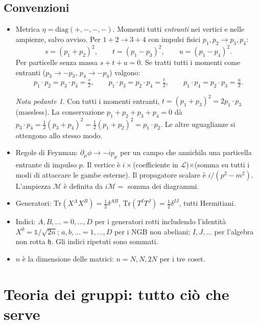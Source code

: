 \documentclass[11pt,a4paper]{article}
\numberwithin{equation}{section}
\theoremstyle{remark}
\newtheorem*{pedante}{Nota pedante}
\newcommand{\Tr}{\mathrm{Tr}}
\newcommand{\h}{\mathfrak{h}}
\newcommand{\one}{\mathbb{1}}
\begin{document}
\subsection{Convenzioni}

\begin{itemize}
\item Metrica $\eta=\mathrm{diag}(+,-,-,-)$. Momenti tutti \emph{entranti} nei vertici e nelle ampiezze, salvo avviso. Per $1+2\to3+4$ con impulsi fisici $p_1,p_2\to p_3,p_4$:
\[
s=(p_1+p_2)^2,\qquad t=(p_1-p_3)^2,\qquad u=(p_1-p_4)^2 .
\]
Per particelle senza massa $s+t+u=0$. Se tratti tutti i momenti come entranti ($p_3\to-p_3$, $p_4\to-p_4$) valgono:
\begin{equation}
p_1\!\cdot p_2=p_3\!\cdot p_4=\tfrac{s}{2},\qquad p_1\!\cdot p_3=p_2\!\cdot p_4=\tfrac{t}{2},\qquad p_1\!\cdot p_4=p_2\!\cdot p_3=\tfrac{u}{2}.
\label{eq:dots}
\end{equation}
\begin{pedante}
Con tutti i momenti entranti, $t=(p_1+p_3)^2=2p_1\!\cdot p_3$ (massless). La conservazione $p_1+p_2+p_3+p_4=0$ dà $p_3\!\cdot p_4=\frac12(p_3+p_4)^2=\frac12(p_1+p_2)^2=p_1\!\cdot p_2$. Le altre uguaglianze si ottengono allo stesso modo.
\end{pedante}
\item Regole di Feynman: $\partial_\mu\phi\to -ip_\mu$ per un campo che annichila una particella entrante di impulso $p$. Il vertice è $i\times$(coefficiente in $\mathcal L$)$\times$(somma su tutti i modi di attaccare le gambe esterne). Il propagatore scalare è $i/(p^2-m^2)$. L'ampiezza $\mathcal M$ è definita da $i\mathcal M=$ somma dei diagrammi.
\item Generatori: $\Tr(X^AX^B)=\frac12\delta^{AB}$, $\Tr(T^IT^J)=\frac12\delta^{IJ}$, tutti Hermitiani.
\item Indici: $A,B,\ldots=0,\dots,D$ per i generatori rotti includendo l'identità $X^0=\one/\sqrt{2n}$; $a,b,\ldots=1,\dots,D$ per i NGB non abeliani; $I,J,\ldots$ per l'algebra non rotta $\h$. Gli indici ripetuti sono sommati.
\item $n$ è la dimensione delle matrici: $n=N,N,2N$ per i tre coset.
\end{itemize}

\section{Teoria dei gruppi: tutto ciò che serve}
\label{sec:groups}
\end{document}
